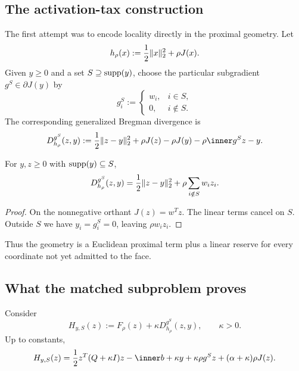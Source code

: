 \subsection{The activation-tax construction}

The first attempt was to encode locality directly in the proximal geometry.
Let
\[
  h_\rho(x):=\frac12\lVert x\rVert_2^2+\rho J(x).
\]
Given $y\ge0$ and a set $S\supseteq\operatorname{supp}(y)$, choose the particular
subgradient $g^S\in\partial J(y)$ by
\begin{equation}
  g_i^S:=
  \begin{cases}
    w_i,&i\in S,\\
    0,&i\notin S.
  \end{cases}
  \label{eq:selected-subgradient}
\end{equation}
The corresponding generalized Bregman divergence is
\[
 D_{h_\rho}^{g^S}(z,y)
 :=\frac12\norm{z-y}_2^2
   +\rho J(z)-\rho J(y)-\rho\ip{g^S}{z-y}.
\]

\begin{lemma}
\label{lem:activation-tax}
For $y,z\ge0$ with $\operatorname{supp}(y)\subseteq S$,
\begin{equation}
  D_{h_\rho}^{g^S}(z,y)
  =\frac12\lVert z-y\rVert_2^2
   +\rho\sum_{i\notin S}w_i z_i.
  \label{eq:activation-tax}
\end{equation}
\end{lemma}

\begin{proof}
On the nonnegative orthant $J(z)=w^Tz$.  The linear terms cancel on $S$.
Outside $S$ we have $y_i=g_i^S=0$, leaving $\rho w_i z_i$.
\end{proof}

Thus the geometry is a Euclidean proximal term plus a linear reserve for every
coordinate not yet admitted to the face.

\subsection{What the matched subproblem proves}

Consider
\begin{equation}
 H_{y,S}(z)
 :=F_\rho(z)+\kappa D_{h_\rho}^{g^S}(z,y),
 \qquad \kappa>0.
 \label{eq:matched-subproblem}
\end{equation}
Up to constants,
\begin{equation}
 H_{y,S}(z)
 =\frac12z^T(Q+\kappa I)z
  -\ip{b+\kappa y+\kappa\rho g^S}{z}
  +(\alpha+\kappa)\rho J(z).
 \label{eq:matched-expansion}
\end{equation}

